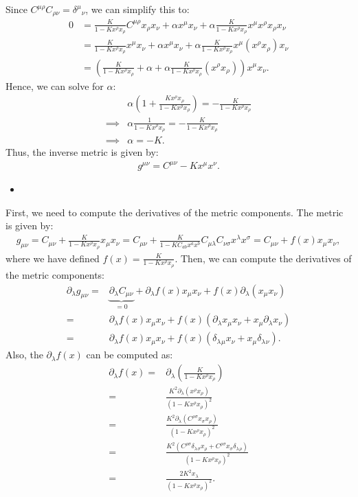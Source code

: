 Since $C^{\mu\rho} C_{\rho\nu} = \delta^\mu{}_\nu$, we can simplify this to:
\begin{align}
     0&=\frac{K}{1-Kx^\rho x_\rho} C^{\mu\rho} x_\rho x_\nu + \alpha x^\mu x_\nu + \alpha \frac{K}{1-Kx^\rho x_\rho} x^\mu x^\rho x_\rho x_\nu \\
     &=\frac{K}{1-Kx^\rho x_\rho} x^\mu x_\nu + \alpha x^\mu x_\nu + \alpha \frac{K}{1-Kx^\rho x_\rho} x^\mu (x^\rho x_\rho) x_\nu \\
    &=\left(\frac{K}{1-Kx^\rho x_\rho} + \alpha + \alpha \frac{K}{1-Kx^\rho x_\rho} (x^\rho x_\rho)\right) x^\mu x_\nu.
\end{align}
Hence, we can solve for $\alpha$:
\begin{align}
    &\alpha \left(1 + \frac{K x^\rho x_\rho}{1-Kx^\rho x_\rho}\right) = -\frac{K}{1-Kx^\rho x_\rho}\\
    \implies& \alpha \frac{1}{1-Kx^\rho x_\rho} = -\frac{K}{1-Kx^\rho x_\rho}\\
    \implies &\alpha = -K.
\end{align}
Thus, the inverse metric is given by:
\begin{align}
    g^{\mu\nu} = C^{\mu\nu} - K x^\mu x^\nu.
\end{align}
\begin{itemize}
    \item [(b)]
\end{itemize}
First, we need to compute the derivatives of the metric components. The metric is given by:
\begin{align}
    g_{\mu\nu} = C_{\mu\nu} + \frac{K}{1-Kx^\rho x_\rho} x_\mu x_\nu= C_{\mu\nu} + \frac{K}{1-KC_{ab} x^a x^b} C_{\mu\lambda} C_{\nu\sigma} x^\lambda x^\sigma=C_{\mu\nu} +f(x) x_\mu x_\nu,
\end{align}
where we have defined $f(x) = \frac{K}{1-Kx^\rho x_\rho}$. Then, we can compute the derivatives of the metric components:
\begin{align}
    \partial_\lambda g_{\mu\nu} =& \underbrace{\partial_\lambda C_{\mu\nu}}_{=0} + \partial_\lambda f(x) x_\mu x_\nu + f(x) \partial_\lambda (x_\mu x_\nu)\\
    =& \partial_\lambda f(x) x_\mu x_\nu + f(x) (\partial_\lambda x_\mu x_\nu + x_\mu \partial_\lambda x_\nu)\\
    =& \partial_\lambda f(x) x_\mu x_\nu + f(x) (\delta_\lambda{}_\mu x_\nu + x_\mu \delta_\lambda{}_\nu).
\end{align}
Also, the $\partial_\lambda f(x)$ can be computed as:
\begin{align}
    \partial_\lambda f(x) =& \partial_\lambda \left(\frac{K}{1-Kx^\rho x_\rho}\right)\\
    =& \frac{K^2 \partial_\lambda (x^\rho x_\rho)}{(1-Kx^\rho x_\rho)^2}\\
    =& \frac{K^2 \partial_\lambda (C^{\rho\sigma} x_\sigma x_\rho)}{(1-Kx^\rho x_\rho)^2}\\
    =& \frac{K^2 (C^{\rho\sigma} \delta_\lambda{}_\sigma x_\rho + C^{\rho\sigma} x_\sigma \delta_\lambda{}_\rho)}{(1-Kx^\rho x_\rho)^2}\\
    =& \frac{2K^2 x_\lambda}{(1-Kx^\rho x_\rho)^2}.
\end{align}
